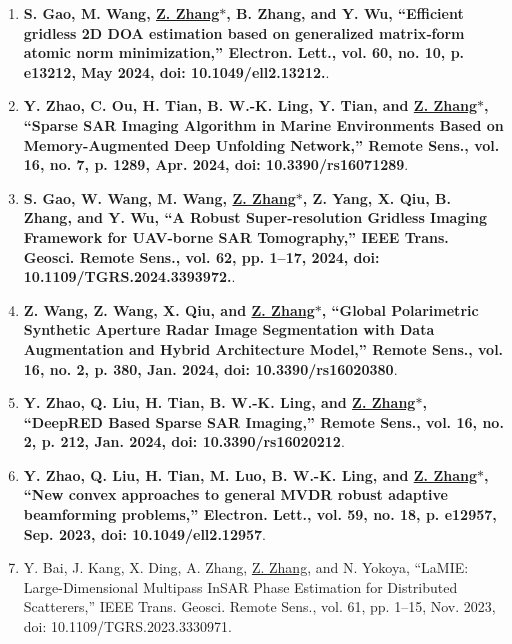 \documentclass[paper=a4,fontsize=11pt]{scrartcl}
\begin{document}
\begin{enumerate}
\item \textbf{S. Gao, M. Wang, \underline{Z. Zhang$\ast$}, B. Zhang, and Y. Wu, 	``Efficient gridless 2D DOA estimation based on generalized matrix‐form atomic norm minimization,'' Electron. Lett., vol. 60, no. 10, p. e13212, May 2024, doi: 10.1049/ell2.13212.}.

\item \textbf{Y. Zhao, C. Ou, H. Tian, B. W.-K. Ling, Y. Tian, and \underline{Z. Zhang$\ast$}, ``Sparse SAR Imaging Algorithm in Marine Environments Based on Memory-Augmented Deep Unfolding Network,'' Remote Sens., vol. 16, no. 7, p. 1289, Apr. 2024, doi: 10.3390/rs16071289}.

\item \textbf{S. Gao, W. Wang, M. Wang, \underline{Z. Zhang$\ast$}, Z. Yang, X. Qiu, B. Zhang, and Y. Wu, ``A Robust Super-resolution Gridless Imaging Framework for UAV-borne SAR Tomography,'' IEEE Trans. Geosci. Remote Sens., vol. 62, pp. 1–17, 2024, doi: 10.1109/TGRS.2024.3393972.}.

\item \textbf{Z. Wang, Z. Wang, X. Qiu, and \underline{Z. Zhang$\ast$}, ``Global Polarimetric Synthetic Aperture Radar Image Segmentation with Data Augmentation and Hybrid Architecture Model,'' Remote Sens., vol. 16, no. 2, p. 380, Jan. 2024, doi: 10.3390/rs16020380}.

\item \textbf{Y. Zhao, Q. Liu, H. Tian, B. W.-K. Ling, and \underline{Z. Zhang$\ast$}, ``DeepRED Based Sparse SAR Imaging,'' Remote Sens., vol. 16, no. 2, p. 212, Jan. 2024, doi: 10.3390/rs16020212}.

\item \textbf{Y. Zhao, Q. Liu, H. Tian, M. Luo, B. W.-K. Ling, and \underline{Z. Zhang$\ast$}, ``New convex approaches to general MVDR robust adaptive beamforming problems,'' Electron. Lett., vol. 59, no. 18, p. e12957, Sep. 2023, doi: 10.1049/ell2.12957}.

\item Y. Bai, J. Kang, X. Ding, A. Zhang, \underline{Z. Zhang}, and N. Yokoya, ``LaMIE: Large-Dimensional Multipass InSAR Phase Estimation for Distributed Scatterers,'' IEEE Trans. Geosci. Remote Sens., vol. 61, pp. 1–15, Nov. 2023, doi: 10.1109/TGRS.2023.3330971.



\end{enumerate}
\end{document}
